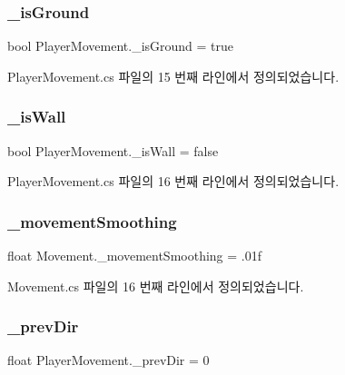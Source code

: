 \subsubsection{\texorpdfstring{\_isGround}{\_isGround}}
{\footnotesize\ttfamily bool Player\+Movement.\+\_\+is\+Ground = true}



Player\+Movement.\+cs 파일의 15 번째 라인에서 정의되었습니다.

\mbox{\label{class_player_movement_a675cef6bf2bfaa54c290f2b73caf91cb}} 
\subsubsection{\texorpdfstring{\_isWall}{\_isWall}}
{\footnotesize\ttfamily bool Player\+Movement.\+\_\+is\+Wall = false}



Player\+Movement.\+cs 파일의 16 번째 라인에서 정의되었습니다.

\mbox{\label{class_movement_aff7ca49ff5d930ac7345da97a5162e3a}} 
\subsubsection{\texorpdfstring{\_movementSmoothing}{\_movementSmoothing}}
{\footnotesize\ttfamily float Movement.\+\_\+movement\+Smoothing = .\+01f\hspace{0.3cm}{\ttfamily [inherited]}}



Movement.\+cs 파일의 16 번째 라인에서 정의되었습니다.

\mbox{\label{class_player_movement_a802b794d028125d4e547a9caeb90d3d4}} 
\subsubsection{\texorpdfstring{\_prevDir}{\_prevDir}}
{\footnotesize\ttfamily float Player\+Movement.\+\_\+prev\+Dir = 0}



